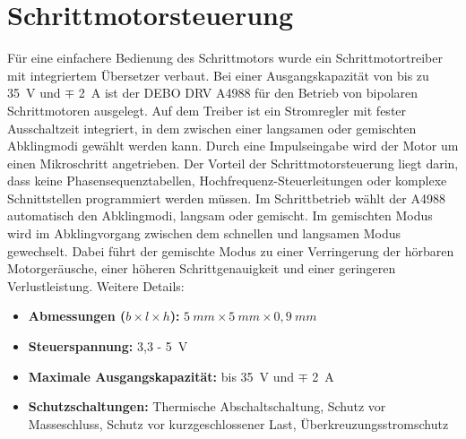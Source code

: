 \section{Schrittmotorsteuerung}	
Für eine einfachere Bedienung des Schrittmotors wurde ein Schrittmotortreiber mit integriertem Übersetzer verbaut. Bei einer Ausgangskapazität von bis zu 35\ V und $\mp$ 2\ A ist der DEBO DRV A4988 für den Betrieb von bipolaren Schrittmotoren ausgelegt. Auf dem Treiber ist ein Stromregler mit fester Ausschaltzeit integriert, in dem zwischen einer langsamen oder gemischten Abklingmodi gewählt werden kann. Durch eine Impulseingabe wird der Motor um einen Mikroschritt angetrieben. Der Vorteil der Schrittmotorsteuerung liegt darin, dass keine Phasensequenztabellen, Hochfrequenz-Steuerleitungen oder komplexe Schnittstellen programmiert werden müssen. Im Schrittbetrieb wählt der A4988 automatisch den Abklingmodi, langsam oder gemischt. Im gemischten Modus wird im Abklingvorgang zwischen dem schnellen und langsamen Modus gewechselt. Dabei führt der gemischte Modus zu einer Verringerung der hörbaren Motorgeräusche, einer höheren Schrittgenauigkeit und einer geringeren Verlustleistung.  
Weitere Details: \begin{itemize}
	\item \textbf{Abmessungen ($b \times l \times h$):} $5 \ mm \times 5 \ mm \times 0,9 \ mm$
	\item \textbf{Steuerspannung:} 3,3 - 5\ V
	\item \textbf{Maximale Ausgangskapazität:} bis 35\ V und $\mp$ 2\ A
	\item \textbf{Schutzschaltungen:}  Thermische Abschaltschaltung, Schutz vor Masseschluss, Schutz vor kurzgeschlossener Last, Überkreuzungsstromschutz
\cite{Allegro.2022}
\end{itemize}




